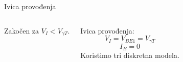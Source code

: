 \begin{frame}[label=10-s012]{Ivica provođenja}
\setlength{\abovedisplayskip}{4pt}\setlength{\belowdisplayskip}{4pt}\setlength{\abovedisplayshortskip}{3pt}\setlength{\belowdisplayshortskip}{3pt}
\begin{columns}[T,onlytextwidth]Zakočen za $V_I<V_{\gamma T}$.\par\bigskip
Ivica provođenja:
\[V_I=V_{BE1}=V_{\gamma T}\]
\[I_B=0\]
Koristimo tri diskretna modela.\centering \end{columns}
\end{frame}
